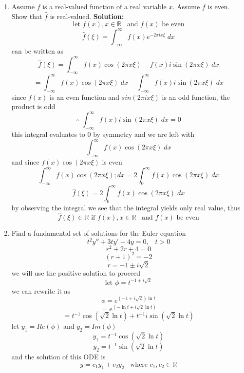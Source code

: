 \documentclass[12pt]{article}
\begin{document}
\begin{enumerate}
\item Assume $f$ is a real-valued function of a real variable $x$.  Assume $f$ is even.  Show that $\hat{f}$ is real-valued.  
\textbf{Solution:}
\\
\[
\text{let } f(x), x \in\mathbb{R} \;\;\; \text{and $f(x)$ be even}
\]
\[
\hat{f}(\xi) = \int_{-\infty}^{\infty} f(x) e^{-2\pi i x \xi} \; dx 
\]
can be written as
\[
\hat{f}(\xi) = \int_{-\infty}^{\infty} f(x)\cos{(2\pi  x \xi)} - f(x)i\sin{(2\pi  x \xi)}\;dx
\]
\[
=\int_{-\infty}^{\infty} f(x)\cos{(2\pi  x \xi)}\;dx - \int_{-\infty}^{\infty}f(x)i\sin{(2\pi  x \xi)}\;dx
\]
since $f(x)$ is an even function and $sin(2\pi i x \xi)$ is an odd function, the product is odd
\\
\[
\therefore \; \int_{-\infty}^{\infty}f(x)i\sin{(2\pi  x \xi)}\;dx =0
\]
this integral evaluates to $0$ by symmetry and we are left with
\[
\int_{-\infty}^{\infty} f(x)\cos{(2\pi  x \xi)}\;dx
\]
and since $f(x)\cos{(2\pi  x \xi)}$ is even
\[
\int_{-\infty}^{\infty} f(x)\cos{(2\pi  x \xi)};dx = 2\int_{0}^{\infty} f(x)\cos{(2\pi  x \xi)}\;dx
\]
\[
\hat{f}(\xi)=2\int_{0}^{\infty} f(x)\cos{(2\pi  x \xi)}\;dx
\]
by observing the integral we see that the integral yields only real value, thus
\[
\hat{f}(\xi)\in\mathbb{R} \text{ if } f(x), x \in\mathbb{R} \;\;\; \text{and $f(x)$ be even}
\]
\newline




\item Find a fundamental set of solutions for the Euler equation 
\[
t^{2} y'' + 3t y' + 4y = 0, \;\;\; t> 0 
\]
\[
r^2+2r+4=0
\]
\[
(r+1)^2=-2
\]
\[
r=-1\pm i\sqrt{2}
\]
we will use the positive solution to proceed
\[
\text{let $\phi = t^{-1+i\sqrt{2}}$}
\]
we can rewrite it as
\[
\phi = e^{(-1+i\sqrt{2})\ln{t}}
\]
\[
=e^{(-\ln{t}+i\sqrt{2}\ln{t})}
\]
\[
=t^{-1}\cos{(\sqrt{2}\ln{t})}+t^{-1}i\sin{(\sqrt{2}\ln{t})}
\]
let $y_1=Re(\phi)$ and $y_2=Im(\phi)$
\[
y_1=t^{-1}\cos{(\sqrt{2}\ln{t})}
\]
\[
y_2=t^{-1}\sin{(\sqrt{2}\ln{t})}
\]
and the solution of this ODE is\[
y=c_1y_1 + c_2y_2 \;\;\; \text{where $c_1,c_2 \in \mathbb{R}$}
\]





\end{enumerate}
\end{document}
